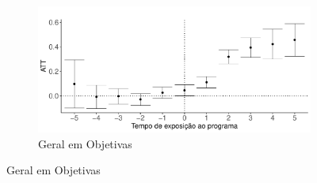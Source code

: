 \begin{figure}[H]
\begin{subfigure}{.5\textwidth}
  \label{fig:efeito_redacao}
\end{subfigure}
\begin{subfigure}{.5\textwidth}
  \centering
  \includegraphics[width=1\linewidth]{Charts/did_agg_objetiva.pdf}  
  \caption{Geral em Objetivas}
  \label{fig:efeito_objetiva}
\end{subfigure}
\label{fig:efeito_agg_objetivas}
\end{figure}

